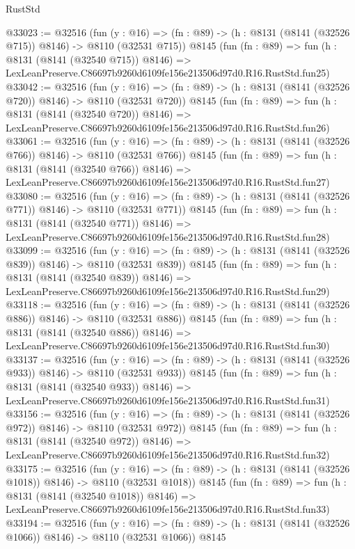 \begin{lexlean}{RustStd}
\begin{coremodule}
@33023 := @32516
    (fun (y : @16) => (fn : @89) -> (h : @8131 (@8141 (@32526 @715)) @8146) -> @8110 (@32531 @715))
    @8145
    (fun (fn : @89) =>
    fun (h : @8131 (@8141 (@32540 @715)) @8146) =>
    LexLeanPreserve.C86697b9260d6109fe156e213506d97d0.R16.RustStd.fun25)
@33042 := @32516
    (fun (y : @16) => (fn : @89) -> (h : @8131 (@8141 (@32526 @720)) @8146) -> @8110 (@32531 @720))
    @8145
    (fun (fn : @89) =>
    fun (h : @8131 (@8141 (@32540 @720)) @8146) =>
    LexLeanPreserve.C86697b9260d6109fe156e213506d97d0.R16.RustStd.fun26)
@33061 := @32516
    (fun (y : @16) => (fn : @89) -> (h : @8131 (@8141 (@32526 @766)) @8146) -> @8110 (@32531 @766))
    @8145
    (fun (fn : @89) =>
    fun (h : @8131 (@8141 (@32540 @766)) @8146) =>
    LexLeanPreserve.C86697b9260d6109fe156e213506d97d0.R16.RustStd.fun27)
@33080 := @32516
    (fun (y : @16) => (fn : @89) -> (h : @8131 (@8141 (@32526 @771)) @8146) -> @8110 (@32531 @771))
    @8145
    (fun (fn : @89) =>
    fun (h : @8131 (@8141 (@32540 @771)) @8146) =>
    LexLeanPreserve.C86697b9260d6109fe156e213506d97d0.R16.RustStd.fun28)
@33099 := @32516
    (fun (y : @16) => (fn : @89) -> (h : @8131 (@8141 (@32526 @839)) @8146) -> @8110 (@32531 @839))
    @8145
    (fun (fn : @89) =>
    fun (h : @8131 (@8141 (@32540 @839)) @8146) =>
    LexLeanPreserve.C86697b9260d6109fe156e213506d97d0.R16.RustStd.fun29)
@33118 := @32516
    (fun (y : @16) => (fn : @89) -> (h : @8131 (@8141 (@32526 @886)) @8146) -> @8110 (@32531 @886))
    @8145
    (fun (fn : @89) =>
    fun (h : @8131 (@8141 (@32540 @886)) @8146) =>
    LexLeanPreserve.C86697b9260d6109fe156e213506d97d0.R16.RustStd.fun30)
@33137 := @32516
    (fun (y : @16) => (fn : @89) -> (h : @8131 (@8141 (@32526 @933)) @8146) -> @8110 (@32531 @933))
    @8145
    (fun (fn : @89) =>
    fun (h : @8131 (@8141 (@32540 @933)) @8146) =>
    LexLeanPreserve.C86697b9260d6109fe156e213506d97d0.R16.RustStd.fun31)
@33156 := @32516
    (fun (y : @16) => (fn : @89) -> (h : @8131 (@8141 (@32526 @972)) @8146) -> @8110 (@32531 @972))
    @8145
    (fun (fn : @89) =>
    fun (h : @8131 (@8141 (@32540 @972)) @8146) =>
    LexLeanPreserve.C86697b9260d6109fe156e213506d97d0.R16.RustStd.fun32)
@33175 := @32516
    (fun (y : @16) =>
    (fn : @89) -> (h : @8131 (@8141 (@32526 @1018)) @8146) -> @8110 (@32531 @1018))
    @8145
    (fun (fn : @89) =>
    fun (h : @8131 (@8141 (@32540 @1018)) @8146) =>
    LexLeanPreserve.C86697b9260d6109fe156e213506d97d0.R16.RustStd.fun33)
@33194 := @32516
    (fun (y : @16) =>
    (fn : @89) -> (h : @8131 (@8141 (@32526 @1066)) @8146) -> @8110 (@32531 @1066))
    @8145

\end{coremodule}
\end{lexlean}
